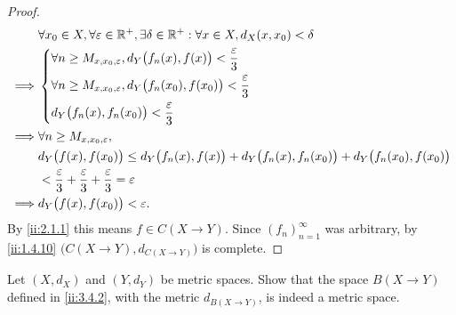 \begin{proof}
  \begin{align*}
             & \forall x_0 \in X, \forall \varepsilon \in \mathbb{R}^+, \exists \delta \in \mathbb{R}^+ : \forall x \in X, d_X(x, x_0) < \delta         \\
    \implies & \begin{dcases}
                 \forall n \geq M_{x, x_0, \varepsilon}, d_Y\big(f_n(x), f(x)\big) < \dfrac{\varepsilon}{3}     \\
                 \forall n \geq M_{x, x_0, \varepsilon}, d_Y\big(f_n(x_0), f(x_0)\big) < \dfrac{\varepsilon}{3} \\
                 d_Y\big(f_n(x), f_n(x_0)\big) < \dfrac{\varepsilon}{3}
               \end{dcases}                           \\
    \implies & \forall n \geq M_{x, x_0, \varepsilon},                                                                                  \\
             & d_Y\big(f(x), f(x_0)\big) \leq d_Y\big(f_n(x), f(x)\big) + d_Y\big(f_n(x), f_n(x_0)\big) + d_Y\big(f_n(x_0), f(x_0)\big) \\
             & < \dfrac{\varepsilon}{3} + \dfrac{\varepsilon}{3} + \dfrac{\varepsilon}{3} = \varepsilon                                 \\
    \implies & d_Y\big(f(x), f(x_0)\big) < \varepsilon.
  \end{align*}
  By \cref{ii:2.1.1} this means \(f \in C(X \to Y)\).
  Since \((f_n)_{n = 1}^\infty\) was arbitrary, by \cref{ii:1.4.10} \(\big(C(X \to Y), d_{C(X \to Y)}\big)\) is complete.
\end{proof}

\exercisesection

\begin{ex}\label{ii:ex:3.4.1}
  Let \((X, d_X)\) and \((Y, d_Y)\) be metric spaces.
  Show that the space \(B(X \to Y)\) defined in \cref{ii:3.4.2}, with the metric \(d_{B(X \to Y)}\), is indeed a metric space.
\end{ex}

